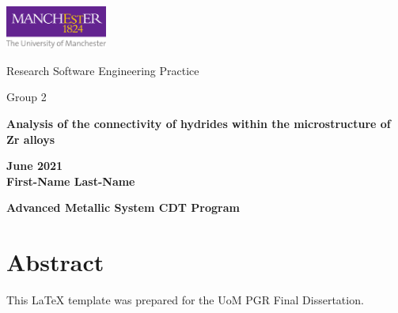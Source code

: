 \documentclass[12pt]{article}
\begin{document}
\onehalfspacing
\thispagestyle{empty} 
\begin{titlepage}
    \includegraphics[width=0.25\textwidth]{uom_logo.pdf}
    \begin{center}
       \vspace*{4cm}
       {\LARGE Research Software Engineering Practice}
       \vspace{3cm}
    \begin{large}   
    
         Group 2 \\
         
         \vspace{0.5cm}

        {\bf Analysis of the connectivity of hydrides within the microstructure of Zr alloys} \\

       \vspace{1.5cm}
        
        {\bf June 2021} \\
                
        
       \vspace{4cm}
       \textbf{First-Name Last-Name}\\
       

       \vfill

       {\bf \large Advanced Metallic System CDT Program}\\
    
    \end{large}  
   \end{center}
\end{titlepage}
\newpage 
\thispagestyle{plain} 
\section*{Abstract}
     This LaTeX template was prepared for the UoM PGR Final Dissertation.
\newpage
\begin{singlespacing}
\tableofcontents
\end{singlespacing}
\setlength{\parskip}{1em}
\renewcommand{\baselinestretch}{2.0}

\newpage 
{}
\setcounter{page}{1}
\onehalfspacing
\end{document}
